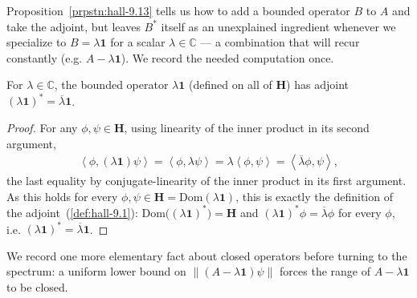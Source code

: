Proposition~\ref{prpstn:hall-9.13} tells us how to add a bounded operator $B$ to $A$ and take the adjoint, but leaves $B^*$ itself as an unexplained ingredient whenever we specialize to $B = \lambda\mathbf{1}$ for a scalar $\lambda \in \mathbb{C}$ — a combination that will recur constantly (e.g. $A - \lambda\mathbf{1}$). We record the needed computation once.

\begin{lemma}
    \label{lmm:adjoint-of-scalar-multiple-of-identity}
    \leanok
    For $\lambda \in \mathbb{C}$, the bounded operator $\lambda\mathbf{1}$ (defined on all of $\mathbf{H}$) has adjoint $(\lambda\mathbf{1})^* = \overline{\lambda}\mathbf{1}$.
\end{lemma}
\begin{proof}
    \leanok
For any $\phi, \psi \in \mathbf{H}$, using linearity of the inner product in its second argument,
\begin{align}
    \left< \phi, (\lambda\mathbf{1})\psi \right> = \left< \phi, \lambda\psi \right> = \lambda \left< \phi, \psi \right> = \left< \overline{\lambda}\phi, \psi \right>,
\end{align}
the last equality by conjugate-linearity of the inner product in its first argument. As this holds for every $\phi,\psi \in \mathbf{H} = \text{Dom}(\lambda\mathbf{1})$, this is exactly the definition of the adjoint~(\ref{def:hall-9.1}): $\text{Dom}\big((\lambda\mathbf{1})^*\big) = \mathbf{H}$ and $(\lambda\mathbf{1})^*\phi = \overline{\lambda}\phi$ for every $\phi$, i.e. $(\lambda\mathbf{1})^* = \overline{\lambda}\mathbf{1}$.
\end{proof}

We record one more elementary fact about closed operators before turning to the spectrum: a uniform lower bound on $\left\| (A - \lambda \mathbf{1})\psi \right\|$ forces the range of $A - \lambda \mathbf{1}$ to be closed.

